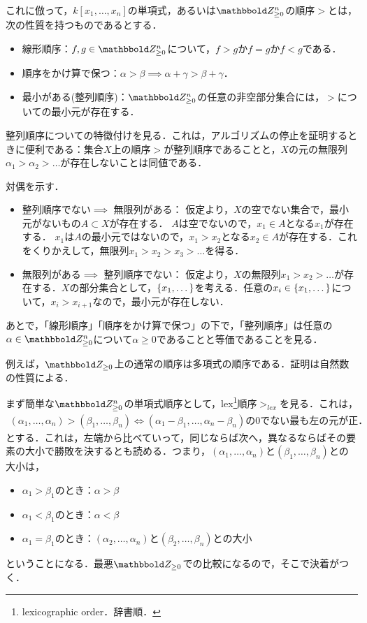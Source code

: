 \documentclass[9pt]{ltjsarticle}
\begin{document}
これに倣って，$k[x_1,\dots,x_n]$の単項式，あるいは$\Zge^n$の順序$>$とは，次の性質を持つものであるとする．
\begin{itemize}
 \item 線形順序：$f,g\in \Zge^n$について，$f > g$か$f=g$か$f < g$である．
 \item 順序をかけ算で保つ：$\alpha > \beta \implies \alpha + \gamma > \beta + \gamma$．
 \item 最小がある(整列順序)：$\Zge^n$の任意の非空部分集合には，$>$についての最小元が存在する．
\end{itemize}

整列順序についての特徴付けを見る．これは，アルゴリズムの停止を証明するときに便利である：集合$X$上の順序$>$が整列順序であることと，$X$の元の無限列$\alpha_1 >  \alpha_2 > \dots$が存在しないことは同値である．
\begin{myproof}
対偶を示す．
 \begin{itemize}
  \item 整列順序でない$\implies$ 無限列がある：
仮定より，$X$の空でない集合で，最小元がないもの$A\subset X$が存在する．
$A$は空でないので，$x_1 \in A$となる$x_1$が存在する．
$x_1$は$A$の最小元ではないので，$x_1 > x_2$となる$x_2 \in A$が存在する．これをくりかえして，無限列$x_1 > x_2 > x_3 > \dots$を得る．
  \item 無限列がある$\implies$ 整列順序でない：
仮定より，$X$の無限列$x_1 > x_2 > \dots$が存在する．$X$の部分集合として，$\left\{x_1,\dots\right\}$を考える．任意の$x_i \in \left\{x_1,\dots\right\}$について，$x_i > x_{i+1}$なので，最小元が存在しない．
 \end{itemize}
\end{myproof}

あとで，「線形順序」「順序をかけ算で保つ」の下で，「整列順序」は任意の$\alpha \in \Zge^n$について$\alpha \ge 0$であることと等価であることを見る．

例えば，$\Zge$上の通常の順序は多項式の順序である．証明は自然数の性質による．

まず簡単な$\Zge^n$の単項式順序として，lex\footnote{lexicographic order．辞書順．}順序$>_{lex}$を見る．これは，
\begin{align}
(\alpha_1,\dots,\alpha_n) > (\beta_1,\dots,\beta_n)
\iff
(\alpha_1 - \beta_1,\dots,\alpha_n - \beta_n)の0でない最も左の元が正．
\end{align}
とする．これは，左端から比べていって，同じならば次へ，異なるならばその要素の大小で勝敗を決するとも読める．つまり，$(\alpha_1,\dots,\alpha_n)$と$(\beta_1,\dots,\beta_n)$との大小は，
\begin{itemize}
 \item $\alpha_1>\beta_1$のとき：$\alpha > \beta$
 \item $\alpha_1 < \beta_1$のとき：$\alpha < \beta$
 \item $\alpha_1 = \beta_1$のとき：$(\alpha_2,\dots,\alpha_n)$と$(\beta_2,\dots,\beta_n)$との大小
\end{itemize}
ということになる．最悪$\Zge$での比較になるので，そこで決着がつく．
\end{document}
